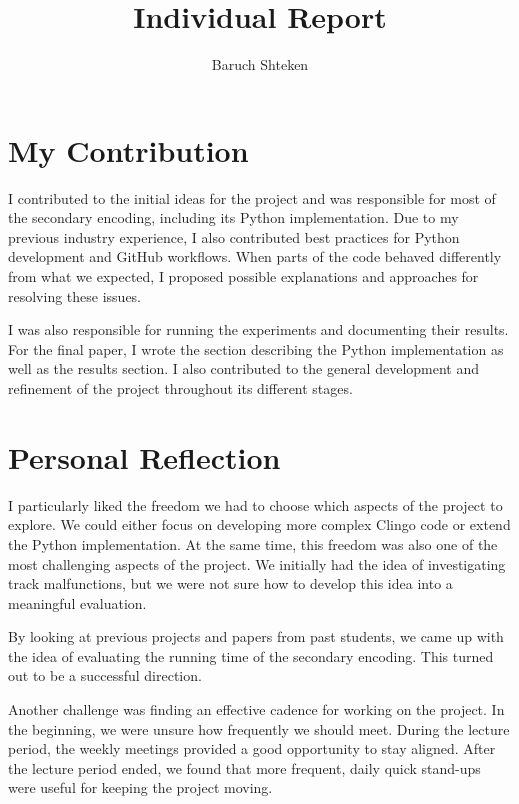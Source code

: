 \documentclass[runningheads]{llncs}
\begin{document}
\title{Individual Report}
\author{Baruch Shteken}

\maketitle

\section{My Contribution}

I contributed to the initial ideas for the project and was responsible
for most of the secondary encoding, including its Python implementation.
Due to my previous industry experience, I also contributed best practices
for Python development and GitHub workflows. When parts of the code behaved
differently from what we expected, I proposed possible explanations and
approaches for resolving these issues.

I was also responsible for running the experiments and documenting their
results. For the final paper, I wrote the section describing the Python
implementation as well as the results section. I also contributed to the
general development and refinement of the project throughout its different
stages.

\section{Personal Reflection}

I particularly liked the freedom we had to choose which aspects of the
project to explore. We could either focus on developing more complex
Clingo code or extend the Python implementation. At the same time, this
freedom was also one of the most challenging aspects of the project. We
initially had the idea of investigating track malfunctions, but we were
not sure how to develop this idea into a meaningful evaluation.

By looking at previous projects and papers from past students, we came
up with the idea of evaluating the running time of the secondary encoding.
This turned out to be a successful direction.

Another challenge was finding an effective cadence for working on the
project. In the beginning, we were unsure how frequently we should meet.
During the lecture period, the weekly meetings provided a good opportunity
to stay aligned. After the lecture period ended, we found that more
frequent, daily quick stand-ups were useful for keeping the project moving.
\end{document}
